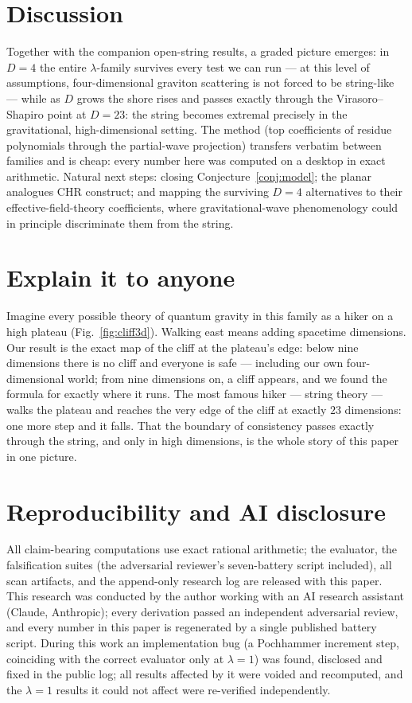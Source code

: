 \documentclass[11pt]{article}
\begin{document}
\section{Discussion}
Together with the companion open-string results, a graded picture emerges:
in $D=4$ the entire $\lambda$-family survives every test we can run --- at
this level of assumptions, four-dimensional graviton scattering is not forced
to be string-like --- while as $D$ grows the shore rises and passes exactly
through the Virasoro--Shapiro point at $D=23$: the string becomes extremal
precisely in the gravitational, high-dimensional setting. The method (top
coefficients of residue polynomials through the partial-wave projection)
transfers verbatim between families and is cheap: every number here was
computed on a desktop in exact arithmetic. Natural next steps: closing
Conjecture~\ref{conj:model}; the planar analogues CHR construct; and mapping
the surviving $D=4$ alternatives to their effective-field-theory
coefficients, where gravitational-wave phenomenology could in principle
discriminate them from the string.

\section*{Explain it to anyone}
Imagine every possible theory of quantum gravity in this family as a hiker on
a high plateau (Fig.~\ref{fig:cliff3d}). Walking east means adding spacetime
dimensions. Our result is the exact map of the cliff at the plateau's edge:
below nine dimensions there is no cliff and everyone is safe --- including
our own four-dimensional world; from nine dimensions on, a cliff appears, and
we found the formula for exactly where it runs. The most famous hiker ---
string theory --- walks the plateau and reaches the very edge of the cliff at
exactly $23$ dimensions: one more step and it falls. That the boundary of
consistency passes exactly through the string, and only in high dimensions,
is the whole story of this paper in one picture.

\section*{Reproducibility and AI disclosure}
All claim-bearing computations use exact rational arithmetic; the evaluator,
the falsification suites (the adversarial reviewer's seven-battery script
included), all scan artifacts, and the append-only research log are released
with this paper. This research was conducted by the author working with an AI
research assistant (Claude, Anthropic); every derivation passed an
independent adversarial review, and every number in this paper is
regenerated by a single published battery script. During this work an
implementation bug (a Pochhammer increment step, coinciding with the correct
evaluator only at $\lambda=1$) was found, disclosed and fixed in the public
log; all results affected by it were voided and recomputed, and the
$\lambda=1$ results it could not affect were re-verified independently.
\end{document}
